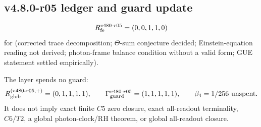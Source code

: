 \subsection*{v4.8.0-r05 ledger and guard update}
\label{subsec:v480-r05-ledger-guard}

\[
R_{\rm fe}^{v480\text{-}r05}=(0,0,1,1,0)
\]
for (corrected trace decomposition; \(\Theta\)-sum conjecture decided; Einstein-equation reading
not derived; photon-frame balance condition without a valid form; GUE statement settled
empirically).

The layer spends no guard:
\[
R_{\rm glob}^{(v480\text{-}r05,+)}=(0,1,1,1,1),
\qquad
\Gamma_{\rm guard}^{v480\text{-}r05}=(1,1,1,1,1),
\qquad
\beta_4=1/256\ \text{unspent}.
\]
It does not imply exact finite \(C5\) zero closure, exact all-readout terminality,
\(C6/T2\), a global photon-clock/RH theorem, or global all-readout closure.

